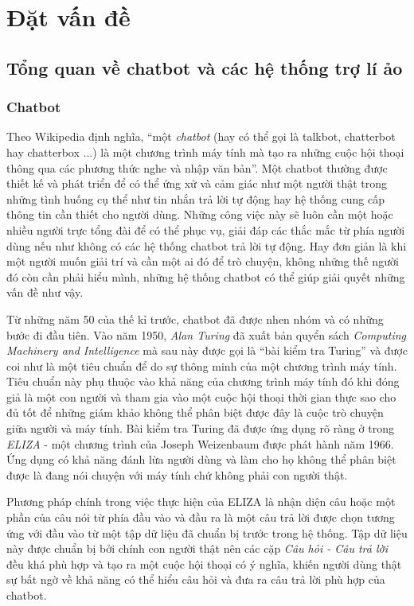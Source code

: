 \documentclass[12pt]{report}
\begin{document}
\startcontents[parts]

\chapter{Đặt vấn đề}
\section{Tổng quan về chatbot và các hệ thống trợ lí ảo}
\subsection{Chatbot}
Theo Wikipedia định nghĩa, ``một \textit{chatbot} (hay có thể gọi là talkbot, chatterbot hay chatterbox ...) là một chương trình máy tính mà tạo ra những cuộc hội thoại thông qua các phương thức nghe và nhập văn bản''. Một chatbot thường được thiết kế và phát triển để có thể ứng xử và cảm giác như một người thật trong những tình huống cụ thể như tin nhắn trả lời tự động hay hệ thống cung cấp thông tin cần thiết cho người dùng. Những công việc này sẽ luôn cần một hoặc nhiều người trực tổng đài để có thể phục vụ, giải đáp các thắc mắc từ phía người dùng nếu như không có các hệ thống chatbot trả lời tự động. Hay đơn giản là khi một người muốn giải trí và cần một ai đó để trò chuyện, không những thế người đó còn cần phải hiểu mình, những hệ thống chatbot có thể giúp giải quyết những vấn đề như vậy.

Từ những năm 50 của thế kỉ trước, chatbot đã được nhen nhóm và có những bước đi đầu tiên. Vào năm 1950, \textit{Alan Turing} đã xuất bản quyển sách \textit{Computing Machinery and Intelligence} mà sau này được gọi là ``bài kiểm tra Turing'' và được coi như là một tiêu chuẩn để do sự thông minh của một chương trình máy tính. Tiêu chuẩn này phụ thuộc vào khả năng của chương trình máy tính đó khi đóng giả là một con người và tham gia vào một cuộc hội thoại thời gian thực sao cho đủ tốt để những giám khảo không thể phân biệt được đây là cuộc trò chuyện giữa người và máy tính. Bài kiểm tra Turing đã được ứng dụng rõ ràng ở trong \textit{ELIZA} - một chương trình của Joseph Weizenbaum được phát hành năm 1966. Ứng dụng có khả năng đánh lừa người dùng và làm cho họ không thể phân biệt được là đang nói chuyện với máy tính chứ không phải con người thật.

Phương pháp chính trong việc thực hiện của ELIZA là nhận diện câu hoặc một phần của câu nói từ phía đầu vào và đầu ra là một câu trả lời được chọn tương ứng với đầu vào từ một tập dữ liệu đã chuẩn bị trước trong hệ thống. Tập dữ liệu này được chuẩn bị bởi chính con người thật nên các cặp \textit{Câu hỏi - Câu trả lời} đều khá phù hợp và tạo ra một cuộc hội thoại có ý nghĩa, khiến người dùng thật sự bất ngờ về khả năng có thể hiểu câu hỏi và đưa ra câu trả lời phù hợp của chatbot.
\end{document}
